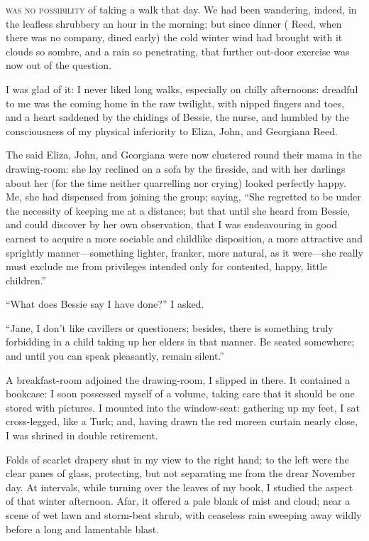 
 \textsc{was no possibility} of taking a walk that day. We had been
wandering, indeed, in the leafless shrubbery an hour in the morning; but
since dinner (\Mrs{} Reed, when there was no company, dined early) the
cold winter wind had brought with it clouds so sombre, and a rain so
penetrating, that further out-door exercise was now out of the question.

I was glad of it: I never liked long walks, especially on chilly
afternoons: dreadful to me was the coming home in the raw twilight, with
nipped fingers and toes, and a heart saddened by the chidings of Bessie,
the nurse, and humbled by the consciousness of my physical inferiority
to Eliza, John, and Georgiana Reed.

The said Eliza, John, and Georgiana were now clustered round their mama
in the drawing-room: she lay reclined on a sofa by the fireside, and
with her darlings about her (for the time neither quarrelling nor
crying) looked perfectly happy. Me, she had dispensed from joining the
group; saying, \enquote{She regretted to be under the necessity of
keeping me at a distance; but that until she heard from Bessie, and
could discover by her own observation, that I was endeavouring in good
earnest to acquire a more sociable and childlike disposition, a more
attractive and sprightly manner---something lighter, franker, more
natural, as it were---she really must exclude me from privileges
intended only for contented, happy, little children.}

\enquote{What does Bessie say I have done?} I asked.

\enquote{Jane, I don't like cavillers or questioners; besides, there is
something truly forbidding in a child taking up her elders in that
manner. Be seated somewhere; and until you can speak pleasantly, remain
silent.}

A breakfast-room adjoined the drawing-room, I slipped in there. It
contained a bookcase: I soon possessed myself of a volume, taking care
that it should be one stored with pictures. I mounted into the
window-seat: gathering up my feet, I sat cross-legged, like a Turk; and,
having drawn the red moreen curtain nearly close, I was shrined in
double retirement.

Folds of scarlet drapery shut in my view to the right hand; to the left
were the clear panes of glass, protecting, but not separating me from
the drear November day. At intervals, while turning over the leaves of
my book, I studied the aspect of that winter afternoon. Afar, it
offered a pale blank of mist and cloud; near a scene of wet lawn and
storm-beat shrub, with ceaseless rain sweeping away wildly before a long
and lamentable blast.

